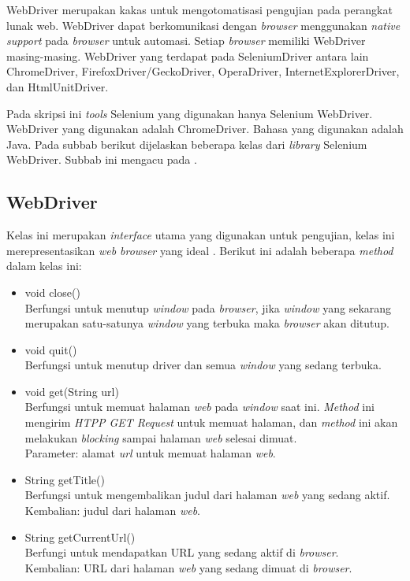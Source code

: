 WebDriver merupakan kakas untuk mengotomatisasi pengujian pada perangkat lunak web\cite{Selenium_doc}. WebDriver dapat berkomunikasi dengan \textit{browser} menggunakan \textit{native support} pada \textit{browser} untuk automasi. Setiap \textit{browser} memiliki WebDriver masing-masing. WebDriver yang terdapat pada SeleniumDriver antara lain ChromeDriver, FirefoxDriver/GeckoDriver, OperaDriver, InternetExplorerDriver, dan HtmlUnitDriver. 

Pada skripsi ini \textit{tools} Selenium yang digunakan hanya Selenium WebDriver. WebDriver yang digunakan adalah ChromeDriver. Bahasa yang digunakan adalah Java. Pada subbab berikut dijelaskan beberapa kelas dari \textit{library} Selenium WebDriver. Subbab ini mengacu pada \cite{Selenium_java_doc}.

\subsection{WebDriver}
\label{subsec:webdriver}
Kelas ini merupakan \textit{interface} utama yang digunakan untuk pengujian, kelas ini merepresentasikan \textit{web browser} yang ideal . Berikut ini adalah beberapa \textit{method} dalam kelas ini:
\begin{itemize}
\item void close()\\
Berfungsi untuk menutup \textit{window} pada \textit{browser}, jika \textit{window} yang sekarang merupakan satu-satunya \textit{window} yang terbuka maka \textit{browser} akan ditutup.
\item void quit()\\
Berfungsi untuk menutup driver dan semua \textit{window} yang sedang terbuka.
\item void get(String url)\\
Berfungsi untuk memuat halaman \textit{web} pada \textit{window} saat ini. \textit{Method} ini mengirim \textit{HTPP GET Request} untuk memuat halaman, dan \textit{method} ini akan melakukan \textit{blocking} sampai halaman \textit{web} selesai dimuat.\\
Parameter: alamat \textit{url} untuk memuat halaman \textit{web}.
\item String getTitle()\\
Berfungsi untuk mengembalikan judul dari halaman \textit{web} yang sedang aktif.\\
Kembalian: judul dari halaman \textit{web}.
\item String getCurrentUrl()\\
Berfungi untuk mendapatkan URL yang sedang aktif di \textit{browser}.\\
Kembalian: URL dari halaman \textit{web} yang sedang dimuat di \textit{browser}.
\end{itemize}

